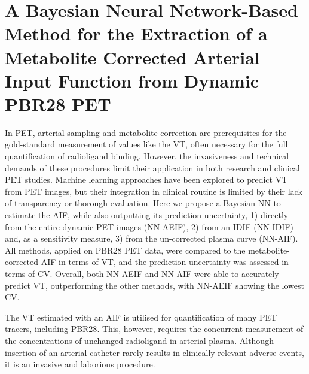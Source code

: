 \chapter{A Bayesian Neural Network-Based Method for the Extraction of a Metabolite Corrected Arterial Input Function from Dynamic PBR28 PET} \label{sec:a_bayesian_neural_network-based_method_for_the_extraction_of_a_metabolite_corrected_arterial_input_function_from_dynamic_pbr28_pet_appendix}
    \newpage

        In \gls{PET}, arterial sampling and metabolite correction are prerequisites for the gold-standard measurement of values like the \gls{VT}, often necessary for the full quantification of radioligand binding. However, the invasiveness and technical demands of these procedures limit their application in both research and clinical \gls{PET} studies. Machine learning approaches have been explored to predict \gls{VT} from \gls{PET} images, but their integration in clinical routine is limited by their lack of transparency or thorough evaluation. Here we propose a Bayesian \gls{NN} to estimate the \gls{AIF}, while also outputting its prediction uncertainty, 1) directly from the entire dynamic \gls{PET} images (\gls{NN}-\gls{AE}\gls{IF}), 2) from an \gls{IDIF} (\gls{NN}-\gls{IDIF}) and, as a sensitivity measure, 3) from the un-corrected plasma curve (\gls{NN}-\gls{AIF}). All methods, applied on \gls{PBR28} \gls{PET} data, were compared to the metabolite-corrected \gls{AIF} in terms of \gls{VT}, and the prediction uncertainty was assessed in terms of \gls{CV}. Overall, both \gls{NN}-\gls{AE}\gls{IF} and \gls{NN}-\gls{AIF} were able to accurately predict \gls{VT}, outperforming the other methods, with \gls{NN}-\gls{AE}\gls{IF} showing the lowest \gls{CV}.

        The \gls{VT} estimated with an \gls{AIF} is utilised for quantification of many \gls{PET} tracers, including \gls{PBR28}. This, however, requires the concurrent measurement of the concentrations of unchanged radioligand in arterial plasma. Although insertion of an arterial catheter rarely results in clinically relevant adverse events, it is an invasive and laborious procedure. 
    
